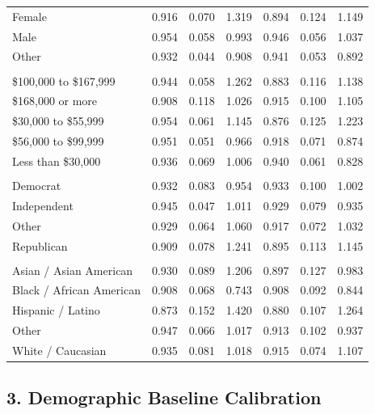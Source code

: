 \documentclass[
  letterpaper,
  DIV=11,
  numbers=noendperiod]{scrartcl}
\begin{document}
\begin{table}
{\begin{tabular*}{\linewidth}{@{\extracolsep{\fill}}lrrrrrr}
\midrule\addlinespace[2.5pt]
Female & 0.916 & 0.070 & 1.319 & 0.894 & 0.124 & 1.149 \\ 
Male & 0.954 & 0.058 & 0.993 & 0.946 & 0.056 & 1.037 \\ 
Other & 0.932 & 0.044 & 0.908 & 0.941 & 0.053 & 0.892 \\ 
\midrule\addlinespace[2.5pt]
\multicolumn{7}{l}{{\bfseries income}} \\[2.5pt] 
\midrule\addlinespace[2.5pt]
\$100,000 to \$167,999 & 0.944 & 0.058 & 1.262 & 0.883 & 0.116 & 1.138 \\ 
\$168,000 or more & 0.908 & 0.118 & 1.026 & 0.915 & 0.100 & 1.105 \\ 
\$30,000 to \$55,999 & 0.954 & 0.061 & 1.145 & 0.876 & 0.125 & 1.223 \\ 
\$56,000 to \$99,999 & 0.951 & 0.051 & 0.966 & 0.918 & 0.071 & 0.874 \\ 
Less than \$30,000 & 0.936 & 0.069 & 1.006 & 0.940 & 0.061 & 0.828 \\ 
\midrule\addlinespace[2.5pt]
\multicolumn{7}{l}{{\bfseries party}} \\[2.5pt] 
\midrule\addlinespace[2.5pt]
Democrat & 0.932 & 0.083 & 0.954 & 0.933 & 0.100 & 1.002 \\ 
Independent & 0.945 & 0.047 & 1.011 & 0.929 & 0.079 & 0.935 \\ 
Other & 0.929 & 0.064 & 1.060 & 0.917 & 0.072 & 1.032 \\ 
Republican & 0.909 & 0.078 & 1.241 & 0.895 & 0.113 & 1.145 \\ 
\midrule\addlinespace[2.5pt]
\multicolumn{7}{l}{{\bfseries race}} \\[2.5pt] 
\midrule\addlinespace[2.5pt]
Asian / Asian American & 0.930 & 0.089 & 1.206 & 0.897 & 0.127 & 0.983 \\ 
Black / African American & 0.908 & 0.068 & 0.743 & 0.908 & 0.092 & 0.844 \\ 
Hispanic / Latino & 0.873 & 0.152 & 1.420 & 0.880 & 0.107 & 1.264 \\ 
Other & 0.947 & 0.066 & 1.017 & 0.913 & 0.102 & 0.937 \\ 
White / Caucasian & 0.935 & 0.081 & 1.018 & 0.915 & 0.074 & 1.107 \\ 
\bottomrule
\end{tabular*}

}

\end{table}%

\subsection{3. Demographic Baseline
Calibration}\label{demographic-baseline-calibration}
\end{document}

